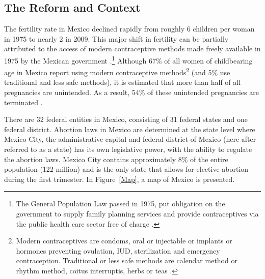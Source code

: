\documentclass[a4paper, 11pt]{article}
\begin{document}
\begin{spacing}{2}
\subsection{The Reform and Context}\label{reform}
The fertility rate in Mexico declined rapidly from roughly 6 children per woman in 1975 to nearly 2 in 2009. This major shift in fertility can be partially attributed to the access of modern contraceptive methods made freely available in 1975 by the Mexican government \citep{GIRE2009}.\footnote{The General Population Law passed in 1975, put obligation on the government to supply family planning services and provide contraceptives via the public health care sector free of charge \citep{GIRE2009}.} Although 67\% of all women of childbearing age in Mexico report using modern contraceptive methods\footnote{Modern contraceptives are condoms, oral or injectable or implants or hormones preventing ovulation, IUD, sterilization and emergency contraception. Traditional or less safe methods are calendar method or rhythm method, coitus interruptis, herbs or teas \cite{WHO2011}.} (and 5\% use traditional and less safe methods), it is estimated that more than half of all pregnancies are unintended. As a result, 54\% of these unintended pregnancies are terminated \citep{GIRE2009}. 

There are 32 federal entities in Mexico, consisting of 31 federal states and one federal district. Abortion laws in Mexico are determined at the state level where Mexico City, the administrative capital and federal district of Mexico (here after referred to as a state) has its own legislative power, with the ability to regulate the abortion laws.  Mexico City contains approximately 8\% of the entire population (122 million) and is the only state that allows for elective abortion during the first trimester. In Figure~\ref{Map}, a map of Mexico is presented. 


\end{spacing}
\end{document}
